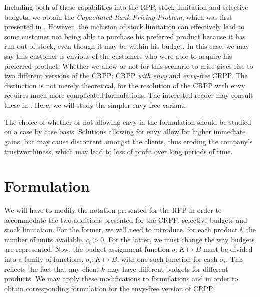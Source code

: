 Including both of these capabilities into the RPP, stock limitation and
selective budgets, we obtain the \emph{Capacitated Rank Pricing Problem}, which
was first presented in \cite{do:envy}. However, the inclusion of stock
limitation can effectively lead to some customer not being able to purchase his
preferred product because it has run out of stock, even though it may be within
his budget. In this case, we may say this customer is envious of the customers
who were able to acquire his preferred product. Whether we allow or not for this
scenario to arise gives rise to two different versions of the CRPP: CRPP
\emph{with envy} and \emph{envy-free} CRPP. The distinction is not merely
theoretical, for the resolution of the CRPP with envy requires much more
complicated formulations. The interested reader may consult these in
\cite{do:envy}. Here, we will study the simpler envy-free variant.

The choice of whether or not allowing envy in the formulation should be studied
on a case by case basis. Solutions allowing for envy allow for higher immediate
gains, but may cause discontent amongst the clients, thus eroding the company's
trustworthiness, which may lead to loss of profit over long periods of time.

\section{Formulation} %
\label{sec:cwe:formulation}

We will have to modify the notation presented for the RPP in order to
accommodate the two additions presented for the CRPP: selective budgets and
stock limitation.  For the former, we will need to introduce, for each product
$\ii$, the number of units available, $c_i > 0$. For the latter, we must change
the way budgets are represented. Now, the budget assignment function $\sigma: K
\mapsto B$ must be divided into a family of functions, $\sigma_i: K \mapsto B$,
with one such function for each $\sigma_i$. This reflects the fact that any
client $k$ may have different budgets for different products. We may apply these
modifications to formulations \slla and \sllb in order to obtain corresponding
formulation for the envy-free version of CRPP:

